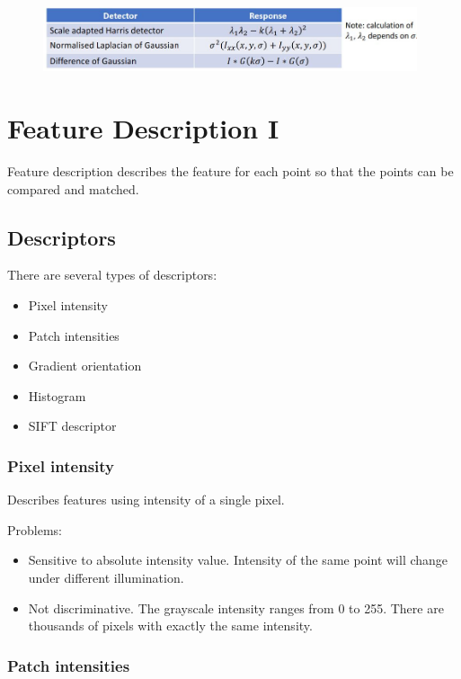 \documentclass{report}
\begin{document}
\begin{figure}[h]
    \centering
    \includegraphics[width=11cm]{Interest point summary.JPG}
\end{figure}

\chapter{Feature Description I}

Feature description describes the feature for each point so that the points can
be compared and matched. 

\section{Descriptors}

There are several types of descriptors:
\begin{itemize}
    \item Pixel intensity
    \item Patch intensities 
    \item Gradient orientation 
    \item Histogram 
    \item SIFT descriptor
\end{itemize}

\subsection{Pixel intensity}

Describes features using intensity of a single pixel. 

Problems:
\begin{itemize}
    \item Sensitive to absolute intensity value. Intensity of the same point
    will change under different illumination.  
    \item Not discriminative. The grayscale intensity ranges from 0 to 255. There are
    thousands of pixels with exactly the same intensity.
\end{itemize}

\subsection{Patch intensities}
\end{document}
